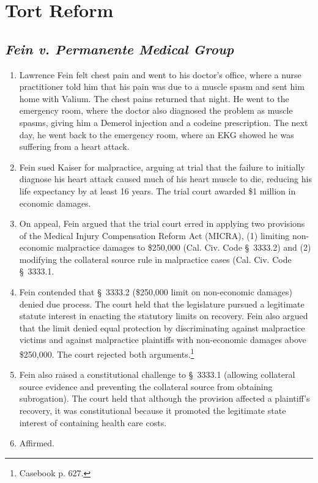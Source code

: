 \section{Tort Reform}

\subsection{\emph{Fein v. Permanente Medical Group}}

\begin{enumerate}
    \item Lawrence Fein felt chest pain and went to his doctor's office, where a 
    nurse practitioner told him that his pain was due to a muscle spasm and sent 
    him home with Valium. The chest pains returned that night. He went to the 
    emergency room, where the doctor also diagnosed the problem as muscle 
    spasms, giving him a Demerol injection and a codeine prescription. The next 
    day, he went back to the emergency room, where an EKG showed he was 
    suffering from a heart attack.
    \item Fein sued Kaiser for malpractice, arguing at trial that the failure to 
    initially diagnose his heart attack caused much of his heart muscle to die, 
    reducing his life expectancy by at least 16 years. The trial court awarded 
    \$1 million in economic damages.
    \item On appeal, Fein argued that the trial court erred in applying two 
    provisions of the Medical Injury Compensation Reform Act (MICRA), (1) limiting 
    non-economic malpractice damages to \$250,000 (Cal. Civ. Code \S\ 3333.2) and (2) modifying the 
    collateral source rule in malpractice cases (Cal. Civ. Code \S\ 3333.1.
    \item Fein contended that \S\ 3333.2 (\$250,000 limit on non-economic 
    damages) denied due process. The court held that the legislature pursued a 
    legitimate statute interest in enacting the statutory limits on recovery. 
    Fein also argued that the limit denied equal protection by discriminating 
    against malpractice victims and against malpractice plaintiffs with 
    non-economic damages above \$250,000. The court rejected both 
    arguments.\footnote{Casebook p. 627.}
    \item Fein also raised a constitutional challenge to \S\ 3333.1 (allowing 
    collateral source evidence and preventing the collateral source from 
    obtaining subrogation). The court held that although the provision affected 
    a plaintiff's recovery, it was constitutional because it promoted the 
    legitimate state interest of containing health care costs.
    \item Affirmed.
\end{enumerate}

